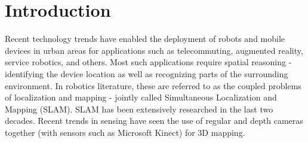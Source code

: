 \section{Introduction}
\label{sec:intro}
%
Recent technology trends have enabled the deployment of robots and mobile devices in urban areas for applications such as telecommuting, augmented reality, service robotics, and others. Most such applications require spatial reasoning - identifying the device location as well as recognizing parts of the surrounding environment. In robotics literature, these are referred to as the coupled problems of localization and mapping - jointly called Simultaneous Localization and Mapping (SLAM). SLAM has been extensively researched in the last two decades. 
Recent trends in sensing have seen the use of regular and depth cameras together (with sensors such as Microsoft Kinect) for 3D mapping. 
